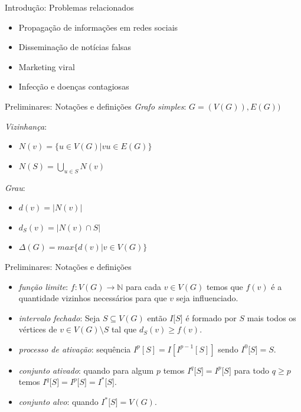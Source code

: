 \documentclass{beamer}
\begin{document}
\begin{frame}{Introdução: Problemas relacionados}
\begin{itemize}
\tightlist
\item
  Propagação de informações em redes sociais
\item
  Disseminação de notícias falsas
\item
  Marketing viral
\item
  Infecção e doenças contagiosas

\end{itemize}
\end{frame}

\begin{frame}{Preliminares: Notações e definições}
\emph{Grafo simples}: \(G = (V(G)), E(G))\)

\emph{Vizinhança}:
\begin{itemize}
\tightlist
\item \(N(v)=\{u \in V(G)|vu \in E(G)\}\) 
\item \(N(S)= \bigcup_{u \in S} N(v)\)
\end{itemize}

\emph{Grau}:  
\begin{itemize}
\tightlist
\item \(d(v)=|N(v)|\) 
\item \(d_S(v)=|N(v)\cap S|\)
\item \(\Delta(G)=max\{d(v)|v \in V(G)\}\)
\end{itemize}
\end{frame}

\begin{frame}{Preliminares: Notações e definições}
\begin{itemize}
\item
  \emph{função limite}: \(f:V(G)\rightarrow \mathbb{N}\) para cada
  \(v \in V(G)\) temos que \(f(v)\) é a quantidade vizinhos necessários
  para que \(v\) seja influenciado.
\item
  \emph{intervalo fechado}: Seja \(S \subseteq V(G)\) então \(I{[}S{]}\)
  é formado por \(S\) mais todos os vértices de
  \(v\in V(G) \setminus S\) tal que \(d_S(v) \ge f(v)\).
\item
  \emph{processo de ativação}: sequência \(I^p[S]=I[I^{p-1}[S]]\) sendo
  \(I^0{[}S{]}=S\).
\item
  \emph{conjunto ativado}: quando para algum \(p\) temos
  \(I^q{[}S{]} = I^p{[}S{]}\) para todo \(q \ge p\) temos
  \(I^q{[}S{]} = I^p{[}S{]}=I^*{[}S{]}\).
\item
  \emph{conjunto alvo}: quando \(I^*{[}S{]}=V(G)\).
\end{itemize}
\end{frame}
\end{document}
